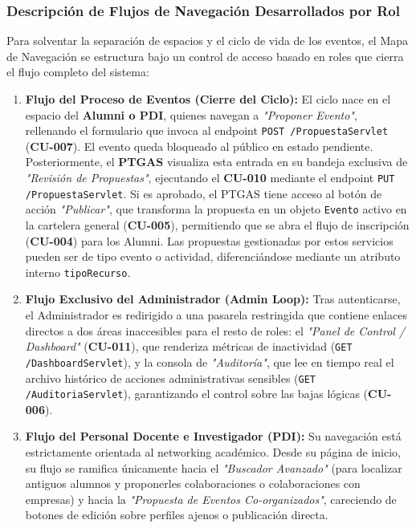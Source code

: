 \documentclass{report}
\begin{document}
\subsubsection*{Descripción de Flujos de Navegación Desarrollados por Rol}
Para solventar la separación de espacios y el ciclo de vida de los eventos, el Mapa de Navegación se estructura bajo un control de acceso basado en roles que cierra el flujo completo del sistema:
\begin{enumerate}
    \item \textbf{Flujo del Proceso de Eventos (Cierre del Ciclo):}
    El ciclo nace en el espacio del \textbf{Alumni o PDI}, quienes navegan a \textit{"Proponer Evento"}, rellenando el formulario que invoca al endpoint \texttt{POST /PropuestaServlet} (\textbf{CU-007}). El evento queda bloqueado al público en estado pendiente. Posteriormente, el \textbf{PTGAS} visualiza esta entrada en su bandeja exclusiva de \textit{"Revisión de Propuestas"}, ejecutando el \textbf{CU-010} mediante el endpoint \texttt{PUT /PropuestaServlet}. Si es aprobado, el PTGAS tiene acceso al botón de acción \textit{"Publicar"}, que transforma la propuesta en un objeto \texttt{Evento} activo en la cartelera general (\textbf{CU-005}), permitiendo que se abra el flujo de inscripción (\textbf{CU-004}) para los Alumni. Las propuestas gestionadas por estos servicios pueden ser de tipo evento o actividad, diferenciándose mediante un atributo interno \texttt{tipoRecurso}.

    \item \textbf{Flujo Exclusivo del Administrador (Admin Loop):}
    Tras autenticarse, el Administrador es redirigido a una pasarela restringida que contiene enlaces directos a dos áreas inaccesibles para el resto de roles: el \textit{"Panel de Control / Dashboard"} (\textbf{CU-011}), que renderiza métricas de inactividad (\texttt{GET /DashboardServlet}), y la consola de \textit{"Auditoría"}, que lee en tiempo real el archivo histórico de acciones administrativas sensibles (\texttt{GET /AuditoriaServlet}), garantizando el control sobre las bajas lógicas (\textbf{CU-006}).

    \item \textbf{Flujo del Personal Docente e Investigador (PDI):}
    Su navegación está estrictamente orientada al networking académico. Desde su página de inicio, su flujo se ramifica únicamente hacia el \textit{"Buscador Avanzado"} (para localizar antiguos alumnos y proponerles colaboraciones o colaboraciones con empresas) y hacia la \textit{"Propuesta de Eventos Co-organizados"}, careciendo de botones de edición sobre perfiles ajenos o publicación directa.


\end{enumerate}
\end{document}

